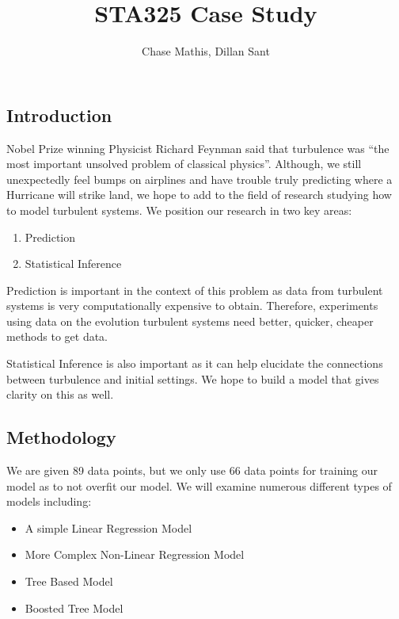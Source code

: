 \documentclass[
  letterpaper,
  DIV=11,
  numbers=noendperiod]{scrartcl}
\title{STA325 Case Study}
\author{Chase Mathis, Dillan Sant}
\date{}
\providecommand{\tightlist}{%
  \setlength{\itemsep}{0pt}\setlength{\parskip}{0pt}}\usepackage{longtable,booktabs,array}
\begin{document}
\maketitle
\ifdefined\Shaded\renewenvironment{Shaded}{\begin{tcolorbox}[borderline west={3pt}{0pt}{shadecolor}, interior hidden, frame hidden, sharp corners, enhanced, boxrule=0pt, breakable]}{\end{tcolorbox}}\fi

\hypertarget{introduction}{%
\subsection{Introduction}\label{introduction}}

Nobel Prize winning Physicist Richard Feynman said that turbulence was
``the most important unsolved problem of classical physics''. Although,
we still unexpectedly feel bumps on airplines and have trouble truly
predicting where a Hurricane will strike land, we hope to add to the
field of research studying how to model turbulent systems. We position
our research in two key areas:

\begin{enumerate}
\def\labelenumi{\arabic{enumi}.}
\tightlist
\item
  Prediction
\item
  Statistical Inference
\end{enumerate}

Prediction is important in the context of this problem as data from
turbulent systems is very computationally expensive to obtain.
Therefore, experiments using data on the evolution turbulent systems
need better, quicker, cheaper methods to get data.

Statistical Inference is also important as it can help elucidate the
connections between turbulence and initial settings. We hope to build a
model that gives clarity on this as well.

\hypertarget{methodology}{%
\subsection{Methodology}\label{methodology}}

We are given 89 data points, but we only use 66 data points for training
our model as to not overfit our model. We will examine numerous
different types of models including:

\begin{itemize}
\tightlist
\item
  A simple Linear Regression Model
\item
  More Complex Non-Linear Regression Model
\item
  Tree Based Model
\item
  Boosted Tree Model
\end{itemize}
\end{document}
